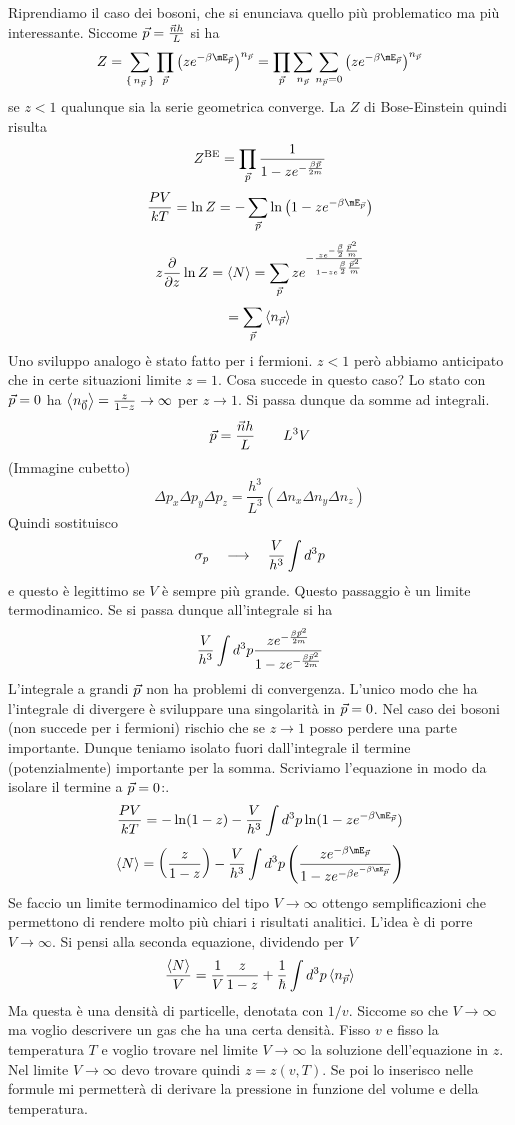 \documentclass[../MeccanicaStatistica.tex]{subfiles}
\begin{document}
Riprendiamo il caso dei bosoni, che si enunciava quello più problematico ma più interessante. Siccome $\vec p = \frac{\vec n h}{L}$ si ha
\[
Z = \sum_{\set{n_{\vect p}}} \prod_{\vect p} \left(z e^{-\beta \mE_{\vect p}}\right)^{n_{\vect p}} = \prod_{\vect p} \sum_{n_{\vect p}} \sum_{n_{\vect p} = 0} \left(z e^{-\beta \mE_{\vect p}}\right)^{n_{\vect p}}
\]
se $z < 1$ qualunque sia la serie geometrica converge. La $Z$ di Bose-Einstein quindi risulta
\[
Z^{\text{BE}} = \prod_{\vec p} \frac{1}{1 - z e^{-\frac{\beta \vec p}{2m}}}
\]
\[
\frac{PV}{kT} = \ln Z = - \sum_{\vect p} \ln\left(1 - z e^{-\beta \mE_{\vect p}}\right)
\]
\[
z \frac{\partial }{\partial z} \ln Z = \left\langle{N}\right\rangle = \sum_{\vec p} z e^{-\frac{z e^{-\frac{\beta}{2} \frac{\vec p^2}{m}}}{1 - z e^{\frac{\beta}{2} \frac{\vec p^2}{m}}}}
\]
\[
= \sum_{\vec p} \left\langle{n_{\vec p}}\right\rangle
\]
Uno sviluppo analogo è stato fatto per i fermioni. $z < 1$ però abbiamo anticipato che in certe situazioni limite $z = 1$. Cosa succede in questo caso? Lo stato con $\vec p = 0$ ha $\left\langle{n_{\vec 0}}\right\rangle = \frac{z}{1 - z} \to \infty$ per $z \to 1$. Si passa dunque da somme ad integrali.
\[
\vec p = \frac{\vec n h}{L} \qquad L^3 V
\]
(Immagine cubetto)
\[
\Delta p_x \Delta p_y \Delta p_z = \frac{h^3}{L^3} (\Delta n_x \Delta n_y \Delta n_z)
\]
Quindi sostituisco
\[
\sigma_p \quad \longrightarrow \quad \frac{V}{h^3} \int d^3 p
\]
e questo è legittimo se $V$ è sempre più grande. Questo passaggio è un limite termodinamico. Se si passa dunque all'integrale si ha
\[
\frac{V}{h^3} \int d^3 p \frac{z e^{-\frac{\beta \vec p^2}{2 m}}}{1 - z e^{-\frac{\beta \vec p^2}{2m}}}
\]
L'integrale a grandi $\vec p$ non ha problemi di convergenza. L'unico modo che ha l'integrale di divergere è sviluppare una singolarità in $\vec p = 0$. Nel caso dei bosoni (non succede per i fermioni) rischio che se $z \to 1$ posso perdere una parte importante. Dunque teniamo isolato fuori dall'integrale il termine (potenzialmente) importante per la somma. Scriviamo l'equazione in modo da isolare il termine a $\vec p = 0$:.
\[
\frac{P V}{k T} = - \ln(1 - z) - \frac{V}{h^3} \int \de^3 p \ln(1 - z e^{-\beta \mE_{\vect p}})
\]
\[
\avg{N} = \left(\frac{z}{1 - z}\right) - \frac{V}{h^3} \int \de^3 p \left(\frac{z e^{- \beta \mE_{\vect p}}}{1 - z e^{- \beta e^{-\beta \mE_{\vect p}}}}\right)
\]
Se faccio un limite termodinamico del tipo $V \to \infty$ ottengo semplificazioni che permettono di rendere molto più chiari i risultati analitici. L'idea è di porre $V \to \infty$. Si pensi alla seconda equazione, dividendo per $V$
\[
\frac{\left\langle{N}\right\rangle}{V} = \frac{1}{V} \frac{z}{1 - z} + \frac{1}{\hbar} \int d^3 p \left\langle{n_{\vec p}}\right\rangle
\]
Ma questa è una densità di particelle, denotata con $1/v$. Siccome so che $V \to \infty$ ma voglio descrivere un gas che ha una certa densità. Fisso $v$ e fisso la temperatura $T$ e voglio trovare nel limite $V \to \infty$ la soluzione dell'equazione in $z$. Nel limite $V \to \infty$ devo trovare quindi $z = z(v,T)$. Se poi lo inserisco nelle formule mi permetterà di derivare la pressione in funzione del volume e della temperatura.
\end{document}
